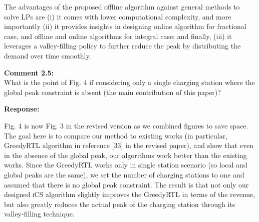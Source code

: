 \documentclass[11pt]{article}
\newcommand{\ics}{\textsc{iCS}\xspace}
\begin{document}
The advantages of the proposed offline algorithm against general methods to solve LPs are (i) it comes with lower computational complexity, and more importantly (ii) it provides insights in designing online algorithm for fractional case, and offline and online algorithms for integral case; and finally, (iii) it leverages a valley-filling policy to further reduce the peak by distributing the demand over time smoothly. 

\vspace{5mm}
{
{\color{blue}\noindent\textbf{Comment 2.5:}\\
What is the point of Fig. 4 if considering only a single charging station where the global peak constraint is absent (the main contribution of this paper)?
}}

\vspace{5mm}
\noindent\textbf{Response:}

Fig. 4 is now Fig. 3 in the revised version as we combined figures to save space.
The goal here is to compare our method to existing works (in particular, GreedyRTL algorithm in reference [33] in the revised paper), and show that even in the absence of the global peak, our algorithms work better than the existing works. Since the GreedyRTL works only in single station scenario (so local and global peaks are the same), we set the number of charging stations to one and assumed that there is no global peak constraint. The result is that not only our designed \ics algorithm slightly improves the GreedyRTL in terms of the revenue, but also greatly reduces the actual peak of the charging station through its valley-filling technique.  
\end{document}
